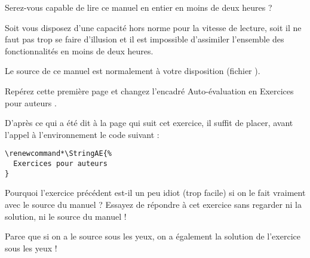 \documentclass[nocrop]{sesamanuel}
\begin{document}
\begin{autoeval}
  \begin{multicols}{2}
    \begin{exercice}
      Serez-vous capable de lire ce manuel en entier en moins de
      deux heures ?
    \end{exercice}
    \begin{corrige}
      Soit vous disposez d'une capacité hors norme pour la vitesse de
      lecture, soit il ne faut pas trop se faire d'illusion et il est
      impossible d'assimiler l'ensemble des fonctionnalités en moins
      de deux heures.
    \end{corrige}
    \begin{exercice}
      Le source de ce manuel est normalement à votre disposition
      (fichier ).

      Repérez cette première page et changez l'encadré \og
      Auto-évaluation \fg{} en \og Exercices pour auteurs \fg{}.
    \end{exercice}
    \begin{corrige}
      D'après ce qui a été dit à la page qui suit cet exercice, il
      suffit de placer, avant l'appel à l'environnement
       le code suivant :
\begin{verbatim}
\renewcommand*\StringAE{%
  Exercices pour auteurs
}
\end{verbatim}
    \end{corrige}
\vfill \columnbreak
    \begin{exercice}
      Pourquoi l'exercice précédent est-il un peu idiot (trop facile) si
      on le fait vraiment avec le source du manuel ? Essayez de
      répondre à cet exercice sans regarder ni la solution, ni le
      source du manuel !
    \end{exercice}
    \begin{corrige}
      Parce que si on a le source sous les yeux, on a également la
      solution de l'exercice sous les yeux !
    \end{corrige}
  \end{multicols}
\end{autoeval}

\cours
\end{document}
